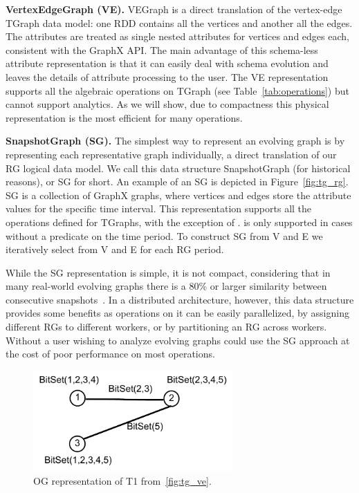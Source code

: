 {\bf VertexEdgeGraph (VE).} VEGraph is a direct translation of the
vertex-edge TGraph data model: one RDD contains all the vertices and
another all the edges.  The attributes are treated as single nested
attributes for vertices and edges each, consistent with the GraphX
API.  The main advantage of this schema-less attribute representation
is that it can easily deal with schema evolution and leaves the
details of attribute processing to the user.  The VE representation
supports all the algebraic operations on TGraph (see
Table~\ref{tab:operations}) but cannot support analytics.  As we will
show, due to compactness this physical representation is the most
efficient for many operations.

{\bf SnapshotGraph (SG).} The simplest way to represent an evolving
graph is by representing each representative graph individually, a
direct translation of our RG logical data model.  We call this data
structure SnapshotGraph (for historical reasons), or SG for short. An
example of an SG is depicted in Figure~\ref{fig:tg_rg}.  SG is a
collection of GraphX graphs, where vertices and edges store the
attribute values for the specific time interval.  This representation
supports all the operations defined for TGraphs, with the exception of
.  is only supported in cases without a
predicate on the time period.  To construct SG from V and E we
iteratively select from V and E for each RG period.

While the SG representation is simple, it is not compact, considering
that in many real-world evolving graphs there is a 80\% or larger
similarity between consecutive
snapshots~\cite{DBLP:journals/tos/MiaoHLWYZPCC15}.  In a distributed
architecture, however, this data structure provides some benefits as
operations on it can be easily parallelized, by assigning different
RGs to different workers, or by partitioning an RG across workers.
Without \ql a user wishing to analyze evolving graphs could use the SG
approach at the cost of poor performance on most operations.

\begin{figure}[t!]
\includegraphics[width=3in]{figs/ogc.pdf}
\caption{OG representation of T1 from~\ref{fig:tg_ve}.}
\label{fig:ogc}
\end{figure}

